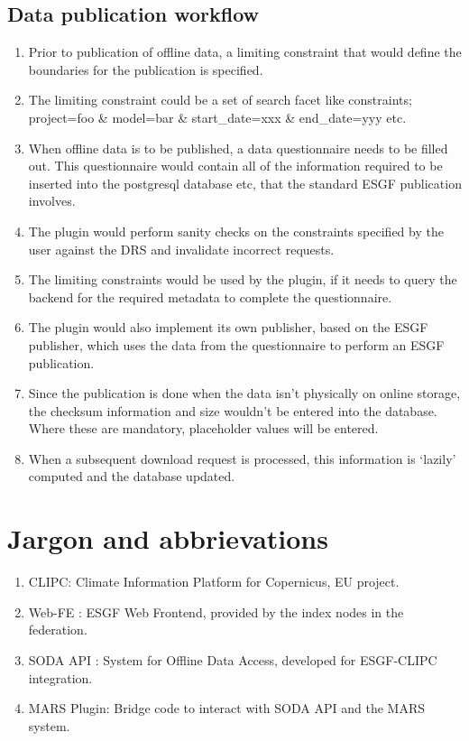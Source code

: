 \documentclass[oneside,12pt]{memoir}
\def\phname{SODA API{ }}
\begin{document}
\section{Data publication workflow}
\begin{enumerate}
\item Prior to publication of offline data, a limiting constraint that would define the boundaries for the publication is specified. 
\item The limiting constraint could be a set of search facet like constraints; project=foo \& model=bar \& start\_date=xxx \& end\_date=yyy etc.
\item When offline data is to be published, a data questionnaire needs to be filled out. This questionnaire would contain all of the information required to be inserted into the postgresql database etc, that the standard ESGF publication involves. 
\item The plugin would perform sanity checks on the constraints specified by the user against the DRS and invalidate incorrect requests.
\item The limiting constraints would be used by the plugin, if it needs to query the backend for the required metadata to complete the questionnaire.
\item The plugin would also implement its own publisher, based on the ESGF publisher, which uses the data from the questionnaire to perform an ESGF publication.
\item Since the publication is done when the data isn't physically on online storage, the checksum information and size wouldn't be entered into the database. Where these are mandatory, placeholder values will be entered.
\item When a subsequent download request is processed, this information is `lazily' computed and the database updated. 
\end{enumerate}
\appendix
{}
\setcounter{secnumdepth}{0}
\chapter{Jargon and abbrievations}
\begin{enumerate}
\item CLIPC: Climate Information Platform for Copernicus, EU project.
\item Web-FE : ESGF Web Frontend, provided by the index nodes in the federation.
\item \phname: System for Offline Data Access, developed for ESGF-CLIPC integration.
\item MARS Plugin: Bridge code to interact with \phname and the MARS system.
\end{enumerate}
\hypertarget{mymarker}{}
\printindex
\end{document}
